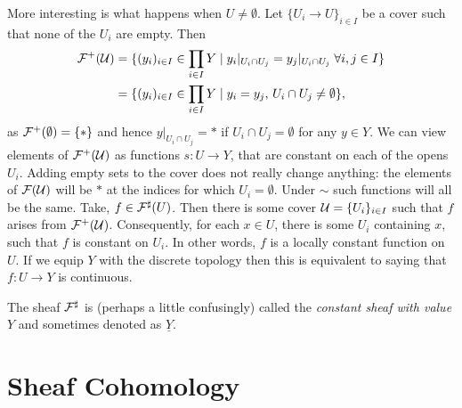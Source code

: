 \documentclass{article}
\begin{document}
\begin{example}
    More interesting is what happens when $U \neq \emptyset$.
    Let $\{U_i \to U\}_{i\in I}$ be a cover such that
    none of the $U_i$ are empty. Then
    \begin{align*}
        \mathcal{F}^+(\mathcal{U}) & =
        \{(y_i)_{i\in I}\in \prod_{i\in I} Y \mid
        y_i|_{U_i \cap U_j} = y_j|_{U_i \cap U_j}\; \forall i,j \in I\} \\
                     & = \{(y_i)_{i\in I}\in \prod_{i\in I}Y\mid
        y_i = y_j,\, U_i \cap U_j \neq \emptyset\},
    \end{align*}
    as $\mathcal{F}^+(\emptyset) = \{*\}$ and hence $y|_{U_i \cap U_j} = *$
    if $U_i \cap U_j = \emptyset$ for any $y \in Y$.
    We can view elements of $\mathcal{F}^+(\mathcal{U})$ as functions $s\colon U \to Y$,
    that are constant on each of the opens $U_i$.
    Adding empty sets
    to the cover does not really change anything: the elements of
    $\mathcal{F}(\mathcal{U})$ will be $*$ at the indices for which $U_i = \emptyset$.
    Under $\sim$ such functions will all be the same.
    Take, $f \in \mathcal{F}^\sharp(U)$. Then there is some cover
    $\mathcal{U} = \{U_i\}_{i\in I}$ such that $f$
    arises from $\mathcal{F}^+(\mathcal{U})$. Consequently, for each $x\in U$,
    there is some $U_i$ containing $x$, such that $f$
    is constant on $U_i$. In other words, $f$ is a locally
    constant function on $U$. If we equip $Y$ with the discrete
    topology then this is equivalent to saying that $f\colon U \to Y$
    is continuous.

    The sheaf $\mathcal{F}^\sharp$ is (perhaps a little confusingly) called the
    \emph{constant sheaf with value $Y$} and sometimes
    denoted as $\underline{Y}$.
\end{example}
\section{Sheaf Cohomology}
\end{document}
